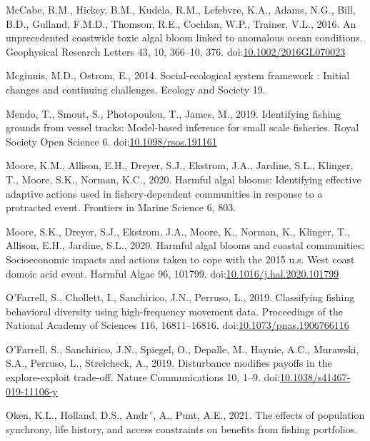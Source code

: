 \documentclass[]{elsarticle} %
\begin{document}
\leavevmode\hypertarget{ref-McCabe2016a}{}%
McCabe, R.M., Hickey, B.M., Kudela, R.M., Lefebvre, K.A., Adams, N.G.,
Bill, B.D., Gulland, F.M.D., Thomson, R.E., Cochlan, W.P., Trainer,
V.L., 2016. An unprecedented coastwide toxic algal bloom linked to
anomalous ocean conditions. Geophysical Research Letters 43, 10,
366--10, 376.
doi:\href{https://doi.org/10.1002/2016GL070023}{10.1002/2016GL070023}

\leavevmode\hypertarget{ref-Mcginnis2014}{}%
Mcginnis, M.D., Ostrom, E., 2014. Social-ecological system framework :
Initial changes and continuing challenges. Ecology and Society 19.

\leavevmode\hypertarget{ref-Mendo2019}{}%
Mendo, T., Smout, S., Photopoulou, T., James, M., 2019. Identifying
fishing grounds from vessel tracks: Model-based inference for small
scale fisheries. Royal Society Open Science 6.
doi:\href{https://doi.org/10.1098/rsos.191161}{10.1098/rsos.191161}

\leavevmode\hypertarget{ref-Moore2020harmful}{}%
Moore, K.M., Allison, E.H., Dreyer, S.J., Ekstrom, J.A., Jardine, S.L.,
Klinger, T., Moore, S.K., Norman, K.C., 2020. Harmful algal blooms:
Identifying effective adaptive actions used in fishery-dependent
communities in response to a protracted event. Frontiers in Marine
Science 6, 803.

\leavevmode\hypertarget{ref-Moore2020}{}%
Moore, S.K., Dreyer, S.J., Ekstrom, J.A., Moore, K., Norman, K.,
Klinger, T., Allison, E.H., Jardine, S.L., 2020. Harmful algal blooms
and coastal communities: Socioeconomic impacts and actions taken to cope
with the 2015 u.s. West coast domoic acid event. Harmful Algae 96,
101799.
doi:\href{https://doi.org/10.1016/j.hal.2020.101799}{10.1016/j.hal.2020.101799}

\leavevmode\hypertarget{ref-OFarrell2019}{}%
O'Farrell, S., Chollett, I., Sanchirico, J.N., Perruso, L., 2019.
Classifying fishing behavioral diversity using high-frequency movement
data. Proceedings of the National Academy of Sciences 116, 16811--16816.
doi:\href{https://doi.org/10.1073/pnas.1906766116}{10.1073/pnas.1906766116}

\leavevmode\hypertarget{ref-OFarrell2019a}{}%
O'Farrell, S., Sanchirico, J.N., Spiegel, O., Depalle, M., Haynie, A.C.,
Murawski, S.A., Perruso, L., Strelcheck, A., 2019. Disturbance modifies
payoffs in the explore-exploit trade-off. Nature Communications 10,
1--9.
doi:\href{https://doi.org/10.1038/s41467-019-11106-y}{10.1038/s41467-019-11106-y}

\leavevmode\hypertarget{ref-Oken2021}{}%
Oken, K.L., Holland, D.S., Andr´, A., Punt, A.E., 2021. The effects of
population synchrony, life history, and access constraints on benefits
from fishing portfolios.
\end{document}
